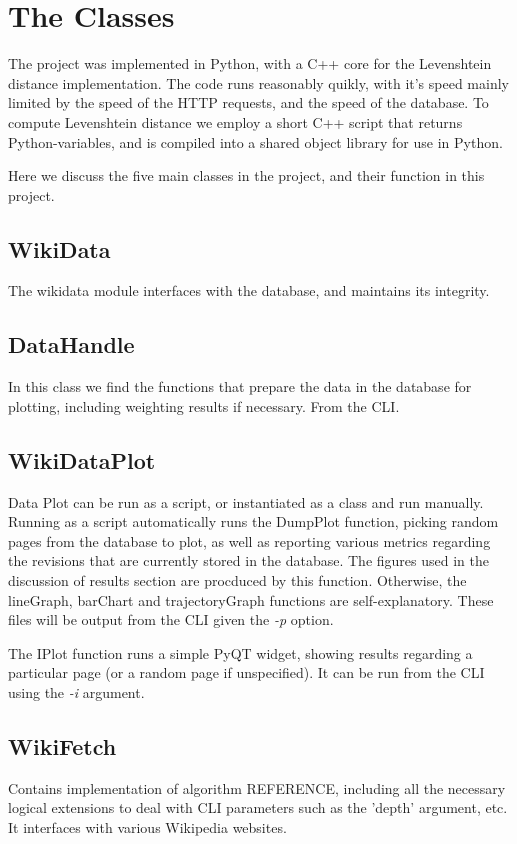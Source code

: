 \section{The Classes}
The project was implemented in Python, with a C++ core for the
Levenshtein distance implementation. The code runs reasonably quikly,
with it's speed mainly limited by the speed of the HTTP requests, and
the speed of the database. To compute Levenshtein distance we employ a
short C++ script that returns Python-variables, and is compiled into a
shared object library for use in Python. 

Here we discuss the five main classes in the project, and their
function in this project.

\subsection*{WikiData}
The wikidata module interfaces with the database, and maintains its
integrity. 

\subsection*{DataHandle}
In this class we find the functions that prepare the data in the
database for plotting, including weighting results if necessary. From
the CLI. 

\subsection*{WikiDataPlot}
Data Plot can be run as a script, or instantiated as a class and run
manually. Running as a script automatically runs the DumpPlot
function, picking random pages from the database to plot, as well as
reporting various metrics regarding the revisions that are currently
stored in the database. The figures used in the discussion of results
section are procduced by this function. Otherwise, the lineGraph,
barChart and trajectoryGraph functions are self-explanatory. These
files will be output from the CLI given the \textit{-p} option.

The IPlot function runs a simple PyQT widget, showing results regarding a
particular page (or a random page if unspecified). It can be run from
the CLI using the \textit{-i} argument.

\subsection*{WikiFetch}
Contains implementation of algorithm REFERENCE, including all the
necessary logical extensions to deal with CLI parameters such as the
'depth' argument, etc. It interfaces with various Wikipedia websites. 

